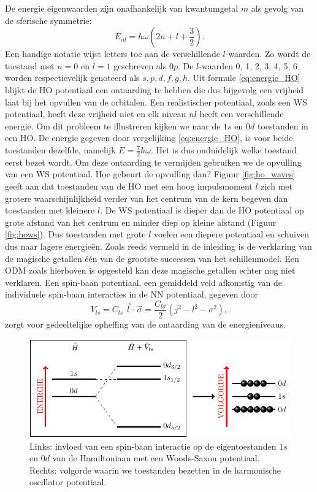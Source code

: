 \documentclass[11pt,twoside]{book}
\begin{document}
De energie eigenwaarden zijn onafhankelijk van kwantumgetal $m$ als gevolg van de sferische symmetrie:
\begin{equation} \label{eq:energie_HO}
E_{nl} = \hbar \omega \left(2n+ l + \frac{3}{2} \right).
\end{equation} 
Een handige notatie wijst letters toe aan de verschillende $l$-waarden. Zo wordt de toestand met $n = 0$ en $l = 1$ geschreven als $0p$. De $l$-waarden 0, 1, 2, 3, 4, 5, 6 worden respectievelijk genoteerd als $s,p,d,f,g,h$.
Uit formule \eqref{eq:energie_HO} blijkt de HO potentiaal een ontaarding te hebben die dus bijgevolg een vrijheid laat bij het opvullen van de orbitalen. Een realistischer potentiaal, zoals een WS potentiaal, heeft deze vrijheid niet en elk niveau $nl$ heeft een verschillende energie. Om dit probleem te illustreren kijken we naar de $1s$ en $0d$ toestanden in een HO. De energie gegeven door vergelijking \eqref{eq:energie_HO}, is voor beide toestanden dezelfde, namelijk $E = \frac{7}{2} \hbar\omega$. Het is dus onduidelijk welke toestand eerst bezet wordt. Om deze ontaarding te vermijden gebruiken we de opvulling van een WS potentiaal. Hoe gebeurt de opvulling dan?  Figuur \ref{fig:ho_waves} geeft aan dat toestanden van de HO met een hoog impulsmoment $l$ zich met grotere waarschijnlijkheid verder van het centrum van de kern begeven dan toestanden met kleinere $l$. De WS potentiaal is dieper dan de HO potentiaal op grote afstand van het centrum en minder diep op kleine afstand (Figuur \ref{fig:hows}). Dus toestanden met grote $l$ voelen een diepere potentiaal en schuiven dus naar lagere energie\"{e}n. 
Zoals reeds vermeld in de inleiding is de verklaring van de magische getallen \'{e}\'{e}n van de grootste successen van het schillenmodel. Een ODM zoals hierboven is opgesteld kan deze magische getallen echter nog niet verklaren. Een  spin-baan potentiaal, een gemiddeld veld afkomstig van de individuele spin-baan interacties in de NN potentiaal, gegeven door
\begin{equation}
V_{ls} = C_{ls}\  \vec{l} \cdot \vec{\sigma} =  \frac{ C_{l\sigma}}{2} \left( j^2 - l^2 - \sigma^2 \right),
\end{equation}
zorgt voor gedeeltelijke opheffing van de ontaarding van de energieniveaus. 
\begin{figure}
\centering
\includegraphics[scale=1]{./figuren/opvulling}
\caption{Links: invloed van een spin-baan interactie op de eigentoestanden $1s$ en $0d$ van de Hamiltoniaan met een Woods-Saxon potentiaal. Rechts: volgorde waarin we toestanden bezetten in de harmonische oscillator potentiaal.}
\label{fig:spin_orbit}
\end{figure}
\end{document}
